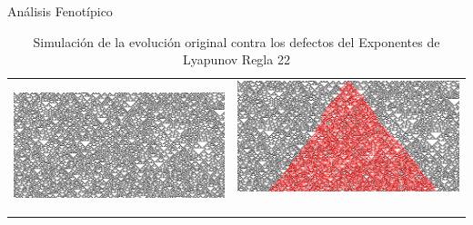 \documentclass[12pt, letterpaper]{article}
\renewcommand{\rule}{Regla 22}
\begin{document}
\begin{section}{Análisis Fenotípico}
\begin{table}[H]
\begin{tabular}{cc}
    \includegraphics[width=70mm ,max height=70 mm , keepaspectratio]{SimAnalysis.png} & \includegraphics[width=70mm ,max height=70 mm , keepaspectratio]{SimDefects.png} \ 
    \end{tabular} 
    \caption{Simulación de la evolución original contra los defectos del Exponentes de Lyapunov \rule} 
    \end{table} 
    \begin{table}[H] 
    \centering 
    \begin{tabular}{cc} 

\end{tabular}
\end{table}
\end{section}
\end{document}
